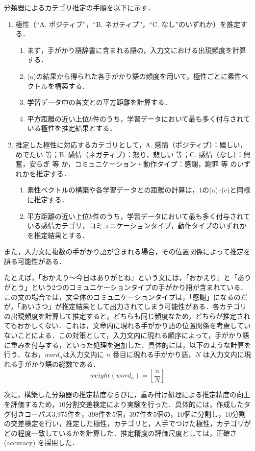 \documentclass[japanese]{jnlp_1.4}
\begin{document}
分類器によるカテゴリ推定の手順を以下に示す．
\begin{enumerate}
\item 極性（``A. ポジティブ''，``B. ネガティブ''，``C. なし''のいずれか）を推定する．
\begin{enumerate}
\item まず，手がかり語辞書に含まれる語の，入力文における出現頻度を計算する．
\item (a)の結果から得られた各手がかり語の頻度を用いて，極性ごとに素性ベクトルを構築する．
\item 学習データ中の各文との平方距離を計算する．
\item 平方距離の近い上位$k$件のうち，学習データにおいて最も多く付与されている極性を推定結果とする．
\end{enumerate}
\item 推定した極性に対応するカテゴリとして，A. 感情（ポジティブ）：嬉しい，めでたい 等；B. 感情（ネガティブ）：怒り，悲しい 等；C. 感情（なし）：興奮，安らぎ 等 か，コミュニケーション・動作タイプ：感謝，謝罪 等 のいずれかを推定する．
\begin{enumerate}
\item 素性ベクトルの構築や各学習データとの距離の計算は，1の(a)--(c)と同様に推定する．
\item 平方距離の近い上位$k$件のうち，学習データにおいて最も多く付与されている感情カテゴリ，コミュニケーションタイプ，動作タイプのいずれかを推定結果とする．
\end{enumerate}
\end{enumerate}

また，入力文に複数の手がかり語が含まれる場合，その位置関係によって推定を誤る可能性がある．

たとえば，「おかえり〜今日はありがとね」という文には，「おかえり」と「ありがとう」という2つのコミュニケーションタイプの手がかり語が含まれている．この文の場合では，文全体のコミュニケーションタイプは，「感謝」になるのだが，「あいさつ」が推定結果として出力されてしまう可能性がある．各カテゴリの出現頻度を計算して推定すると，どちらも同じ頻度なため，どちらが推定されてもおかしくない．これは，文章内に現れる手がかり語の位置関係を考慮していないことによる．この対策として，入力文内に現れる順序によって，手がかり語に重みを付与する，といった処理を追加した．具体的には，以下のような計算を行う．なお，$word_{n}$は入力文内に $n$ 番目に現れる手がかり語，$N$ は入力文内に現れる手がかり語の総数である．
\[
weight(word_{n}) = \left[\frac{n}{N}\right]
\]

次に，構築した分類器の推定精度ならびに，重み付け処理による推定精度の向上を評価するため，10分割交差検定により実験を行った．具体的には，作成したタグ付きコーパス3,975件を，398件を5個，397件を5個の，10個に分割し，10分割の交差検定を行い，推定した極性，カテゴリと，人手でつけた極性，カテゴリがどの程度一致しているかを計算した．推定精度の評価尺度としては，正確さ (accuracy) を採用した．
\end{document}

